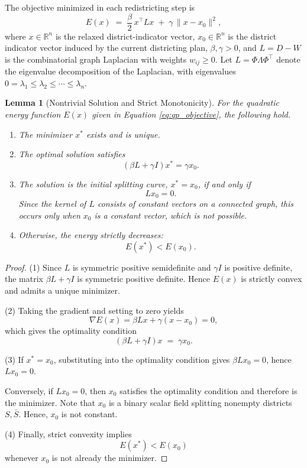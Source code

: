 \documentclass[11pt]{article}
\newtheorem{lemma}{Lemma}[section]
\begin{document}
The objective minimized in each redistricting step is
\begin{equation}
    \label{eq:qp_objective}
    E(x)
    \;=\;
    \frac{\beta}{2}\, x^{\top} L x
    \;+\;
    \gamma \,\|x - x_0\|^2,
\end{equation}
where $x \in \mathbb{R}^n$ is the relaxed district-indicator vector, $x_0 \in \mathbb{R}^n$ is the district indicator vector induced by the current districting plan, $\beta,\gamma>0$, and $L=D-W$ is the combinatorial graph Laplacian with weights $w_{ij} \ge 0$. Let $L = \Phi \Lambda \Phi^{\top}$ denote the eigenvalue decomposition of the Laplacian, with eigenvalues $0=\lambda_1 \le \lambda_2 \le \cdots \le \lambda_n$. 

\begin{lemma}[Nontrivial Solution and Strict Monotonicity]
For the quadratic energy function $E(x)$ given in Equation \eqref{eq:qp_objective}, the following hold.

\begin{enumerate}
\item The minimizer $x^*$ exists and is unique.
\item The optimal solution satisfies
\[
(\beta L + \gamma I)x^* = \gamma x_0.
\]
\item The solution is the initial splitting curve, $x^*=x_0$, if and only if
\[
L x_0 = 0.
\]
Since the kernel of $L$ consists of constant vectors on a connected graph, this occurs only when $x_0$ is a constant vector, which is not possible.
\item Otherwise, the energy strictly decreases:
\[
E(x^*) < E(x_0).
\]
\end{enumerate}
\end{lemma}

\begin{proof}
(1) Since $L$ is symmetric positive semidefinite and $\gamma I$ is positive definite, the matrix $\beta L + \gamma I$ is symmetric positive definite. Hence $E(x)$ is strictly convex and admits a unique minimizer.

(2) Taking the gradient and setting to zero yields
\[
\nabla E(x) = \beta Lx + \gamma(x-x_0) = 0,
\]
which gives the optimality condition 
\begin{equation}\label{eq:optimality}
    (\beta L + \gamma I) x \;=\; \gamma x_0.
\end{equation}

(3) If $x^*=x_0$, substituting into the optimality condition gives $\beta Lx_0=0$, hence $Lx_0=0$.

Conversely, if $Lx_0=0$, then $x_0$ satisfies the optimality condition and therefore is the minimizer. Note that $x_0$ is a binary scalar field splitting nonempty districts $S, \bar S$. Hence, $x_0$ is not constant.

(4) Finally, strict convexity implies
\[
E(x^*) < E(x_0)
\]
whenever $x_0$ is not already the minimizer.
\end{proof}
\end{document}
